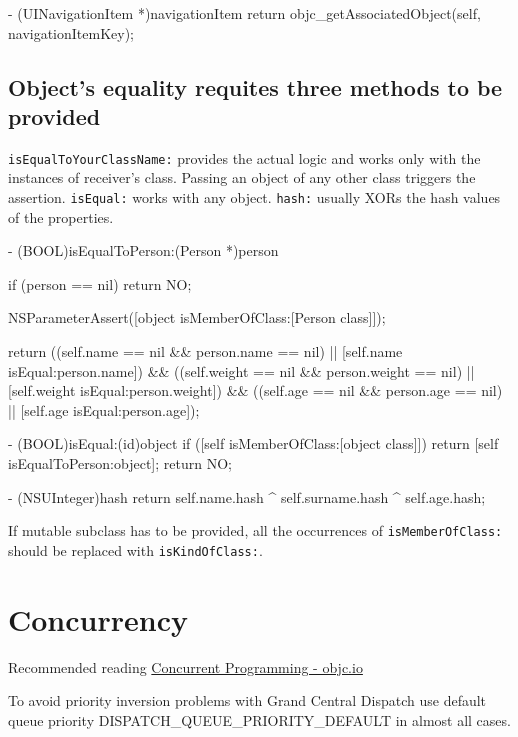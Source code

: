 \documentclass[10pt]{extarticle}
\newenvironment{importantlisting}
{\mdframed[middlelinewidth=0.5pt, middlelinecolor=MatisseColor, skipabove=15pt]{\textbf{Important:}}}
{\endmdframed\vspace{12pt}}
\newcommand{\inlinecode}[1]{{\textcolor{TundoraColor}{\texttt{#1}}}}
\begin{document}
\begin{codelisting}
- (UINavigationItem *)navigationItem
{
    return objc_getAssociatedObject(self, navigationItemKey);
}
\end{codelisting}


\subsection{Object's equality requites three methods to be provided}

\inlinecode{isEqualToYourClassName:} provides the actual logic and works only with the instances of receiver's class. Passing an object of any other class triggers the assertion. \inlinecode{isEqual:} works with any object. \inlinecode{hash:} usually XORs the hash values of the properties.

\begin{codelisting}
- (BOOL)isEqualToPerson:(Person *)person
{
    if (person == nil) return NO;
    
    NSParameterAssert([object isMemberOfClass:[Person class]]);
    
    return ((self.name   == nil && person.name   == nil) || [self.name   isEqual:person.name])   &&
           ((self.weight == nil && person.weight == nil) || [self.weight isEqual:person.weight]) &&
           ((self.age    == nil && person.age    == nil) || [self.age    isEqual:person.age]);
}

- (BOOL)isEqual:(id)object
{
    if ([self isMemberOfClass:[object class]]) return [self isEqualToPerson:object];
    return NO;
}

- (NSUInteger)hash
{
    return self.name.hash ^ self.surname.hash ^ self.age.hash;
}
\end{codelisting}

If mutable subclass has to be provided, all the occurrences of \inlinecode{isMemberOfClass:} should be replaced with \inlinecode{isKindOfClass:}.


\section{Concurrency}

Recommended reading  \href{http://www.objc.io/issue-2/}{Concurrent Programming - objc.io}

\begin{importantlisting}
To avoid priority inversion problems with Grand Central Dispatch use default queue priority DISPATCH\_QUEUE\_PRIORITY\_DEFAULT in almost all cases.
\end{importantlisting}
\end{document}
